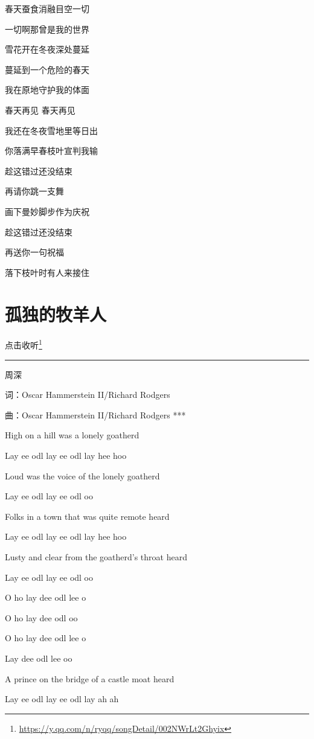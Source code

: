 \documentclass[]{ctexbook}
\renewcommand{\href}[2]{#2\footnote{\url{#1}}}
\begin{document}
春天蚕食消融目空一切

一切啊那曾是我的世界

雪花开在冬夜深处蔓延

蔓延到一个危险的春天

我在原地守护我的体面

春天再见 春天再见

我还在冬夜雪地里等日出

你落满早春枝叶宣判我输

趁这错过还没结束

再请你跳一支舞

画下曼妙脚步作为庆祝

趁这错过还没结束

再送你一句祝福

落下枝叶时有人来接住

\section*{孤独的牧羊人}\label{lonely-shepherd}


\href{https://y.qq.com/n/ryqq/songDetail/002NWrLt2Ghyix}{点击收听}

\begin{center}\rule{0.5\linewidth}{0.5pt}\end{center}

周深

词：Oscar Hammerstein II/Richard Rodgers

曲：Oscar Hammerstein II/Richard Rodgers
***

High on a hill was a lonely goatherd

Lay ee odl lay ee odl lay hee hoo

Loud was the voice of the lonely goatherd

Lay ee odl lay ee odl oo

Folks in a town that was quite remote heard

Lay ee odl lay ee odl lay hee hoo

Lusty and clear from the goatherd's throat heard

Lay ee odl lay ee odl oo

O ho lay dee odl lee o

O ho lay dee odl oo

O ho lay dee odl lee o

Lay dee odl lee oo

A prince on the bridge of a castle moat heard

Lay ee odl lay ee odl lay ah ah
\end{document}
